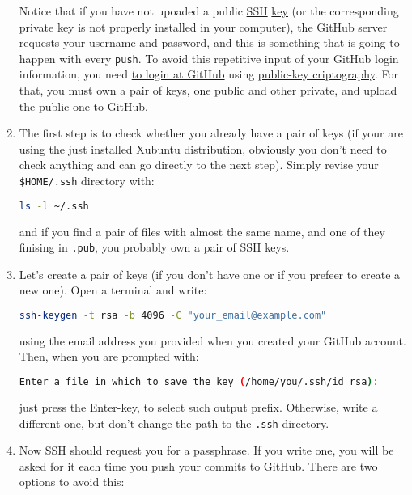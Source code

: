 \begin{enumerate}
  Notice that if you have not upoaded a public
  \href{https://www.ssh.com/}{SSH}
  \href{https://www.ssh.com/ssh/identity-key}{key} (or the
  corresponding private key is not properly installed in your
  computer), the GitHub server requests your username and password,
  and this is something that is going to happen with every
  \texttt{push}. To avoid this repetitive input of your GitHub login
  information, you need
  \href{https://docs.github.com/en/github/authenticating-to-github/connecting-to-github-with-ssh}{to
    login at GitHub} using
  \href{https://en.wikipedia.org/wiki/Public-key_cryptography}{public-key
    criptography}. For that, you must own a pair of keys, one public
  and other private, and upload the public one to GitHub.
  
\item The first step is to check whether you already have a pair of
  keys (if your are using the just installed Xubuntu distribution,
  obviously you don't need to check anything and can go directly to
  the next step). Simply revise your \texttt{\$HOME/.ssh} directory
  with:

  \begin{lstlisting}[language=bash]
    ls -l ~/.ssh
  \end{lstlisting}

  and if you find a pair of files with almost the same name, and one
  of they finising in \texttt{.pub}, you probably own a pair of SSH
  keys.

\item Let's create a pair of keys (if you don't have one or if you
  prefeer to create a new one). Open a terminal and write:

  \begin{lstlisting}[language=bash]
    ssh-keygen -t rsa -b 4096 -C "your_email@example.com"
  \end{lstlisting}

  using the email address you provided when you created your GitHub
  account. Then, when you are prompted with:

  \begin{lstlisting}[language=bash]
    Enter a file in which to save the key (/home/you/.ssh/id_rsa):
  \end{lstlisting}

  just press the Enter-key, to select such output prefix. Otherwise,
  write a different one, but don't change the path to the
  \texttt{.ssh} directory.

\item Now SSH should request you for a passphrase. If you write one,
  you will be asked for it each time you push your commits to
  GitHub. There are two options to avoid this:


\end{enumerate}
